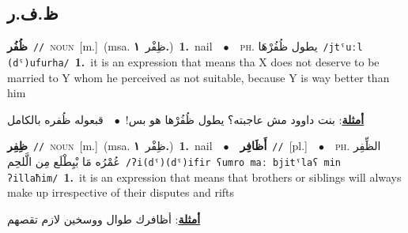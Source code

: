 \documentclass[10pt,a4paper,twoside]{article} %
\begin{document}
\begin{multicols}{2}
{{\vspace{-3mm}
\subsection*{\color{blue}\foreignlanguage{arabic}{ظ.ف.ر}\color{blue}{}} 

{\setlength\topsep{0pt}\textbf{\foreignlanguage{arabic}{ظُفُر}}\ {\color{gray}\texttt{//}\color{black}}\ \textsc{noun}\ [m.]\ \color{gray}(msa. \foreignlanguage{arabic}{ظِفْر}~\foreignlanguage{arabic}{\textbf{١.}})\color{black}\ \textbf{1.}~nail\ \ $\bullet$\ \ \textsc{ph.} \color{gray} \foreignlanguage{arabic}{يطول ظُفُرْهَا}\color{black}\ {\color{gray}\texttt{/{\sffamily jtˤuːl (dˤ)ufurha}/}\color{black}}\ \textbf{1.}~it is an expression that means tha X does not deserve to be married to Y whom he perceived as not suitable, because Y is way better than him\  \begin{flushright}\color{gray}\foreignlanguage{arabic}{\textbf{\underline{\foreignlanguage{arabic}{أمثلة}}}: بنت داوود مش عاجبته؟ يطول ظُفُرْها هو بس!\ $\bullet$\ \  قبعوله ظُفره بالكامل}\end{flushright}\color{black}} \vspace{2mm}

{\setlength\topsep{0pt}\textbf{\foreignlanguage{arabic}{ظِفِر}}\ {\color{gray}\texttt{//}\color{black}}\ \textsc{noun}\ [m.]\ \color{gray}(msa. \foreignlanguage{arabic}{ظِفْر}~\foreignlanguage{arabic}{\textbf{١.}})\color{black}\ \textbf{1.}~nail\ \ $\bullet$\ \ \setlength\topsep{0pt}\textbf{\foreignlanguage{arabic}{أَظَافِر}}\ {\color{gray}\texttt{//}\color{black}}\ [pl.]\ \ $\bullet$\ \ \textsc{ph.} \color{gray} \foreignlanguage{arabic}{الظِّفِر عُمْرُه مَا بْيِطْلَع مِن الَّلحِم}\color{black}\ {\color{gray}\texttt{/{\sffamily ʔi(dˤ)(dˤ)ifir ʕumro maː bjitˤlaʕ min ʔillaħim}/}\color{black}}\ \textbf{1.}~it is an expression that means that brothers or siblings will always make up irrespective of their disputes and rifts\  \begin{flushright}\color{gray}\foreignlanguage{arabic}{\textbf{\underline{\foreignlanguage{arabic}{أمثلة}}}: أظافرك طوال ووسخين لازم تقصهم}\end{flushright}\color{black}} \vspace{2mm}

}}
\end{multicols}
\end{document}
